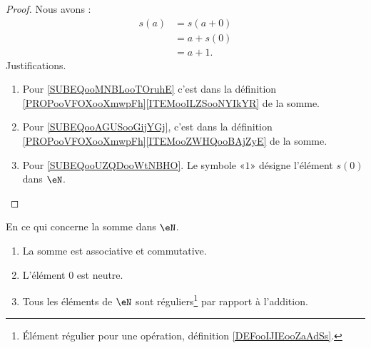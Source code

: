 \begin{proof}
    Nous avons :
    \begin{subequations}
        \begin{align}
            s(a)&=s(a+0)        \label{SUBEQooMNBLooTOruhE}\\
            &=a+s(0)        \label{SUBEQooAGUSooGijYGj}\\
            &=a+1.          \label{SUBEQooUZQDooWtNBHO}
        \end{align}
    \end{subequations}
    Justifications.
    \begin{enumerate}
        \item
            Pour \eqref{SUBEQooMNBLooTOruhE} c'est dans la définition \ref{PROPooVFOXooXmwpFh}\ref{ITEMooILZSooNYIkYR} de la somme.
        \item
            Pour \eqref{SUBEQooAGUSooGijYGj}, c'est dans la définition \ref{PROPooVFOXooXmwpFh}\ref{ITEMooZWHQooBAjZyE} de la somme.
        \item
            Pour \eqref{SUBEQooUZQDooWtNBHO}. Le symbole «\( 1\)» désigne l'élément \( s(0)\) dans \( \eN\).
    \end{enumerate}
\end{proof}

\begin{proposition}     \label{PROPooTLTSooGNMTmV}
    En ce qui concerne la somme dans \( \eN\).
    \begin{enumerate}
        \item       \label{ITEMooIFFPooXfftfG}
            La somme est associative et commutative.
        \item       \label{ITEMooSGRVooPAVFYK}
            L'élément \( 0\) est neutre.
        \item       \label{ITEMooNUTHooJWWzGv}
            Tous les éléments de \( \eN\) sont réguliers\footnote{Élément régulier pour une opération, définition \ref{DEFooIJIEooZaAdSs}.} par rapport à l'addition.
    \end{enumerate}
\end{proposition}

